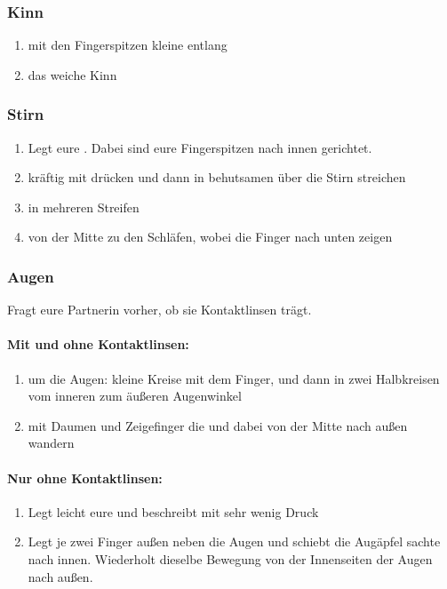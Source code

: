 \subsubsection{Kinn}
\begin{enumerate}
  \item mit den Fingerspitzen kleine  entlang
  \item das weiche Kinn 
\end{enumerate}


\subsubsection{Stirn}

\begin{enumerate}
  \item Legt eure . Dabei sind eure Fingerspitzen nach innen gerichtet.
  \item kräftig mit  drücken und dann in behutsamen  über die Stirn streichen
  \item {} in mehreren Streifen
  \item {} von der Mitte zu den Schläfen, wobei die Finger nach unten zeigen
\end{enumerate}
\pagebreak


\subsubsection{Augen}

Fragt eure Partnerin vorher, ob sie Kontaktlinsen trägt.

\paragraph{Mit und ohne Kontaktlinsen:}
\begin{enumerate}
  \item {} um die Augen: kleine Kreise mit dem Finger, und dann in zwei Halbkreisen vom inneren zum äußeren Augenwinkel
  \item mit Daumen und Zeigefinger die  und dabei von der Mitte nach außen wandern
\end{enumerate}

\paragraph{Nur ohne Kontaktlinsen:}
\begin{enumerate}
  \item Legt leicht eure  und beschreibt mit sehr wenig Druck 
  \item {} Legt je zwei Finger außen neben die Augen und schiebt die Augäpfel sachte nach innen. Wiederholt dieselbe Bewegung von der Innenseiten der Augen nach außen.
\end{enumerate}


